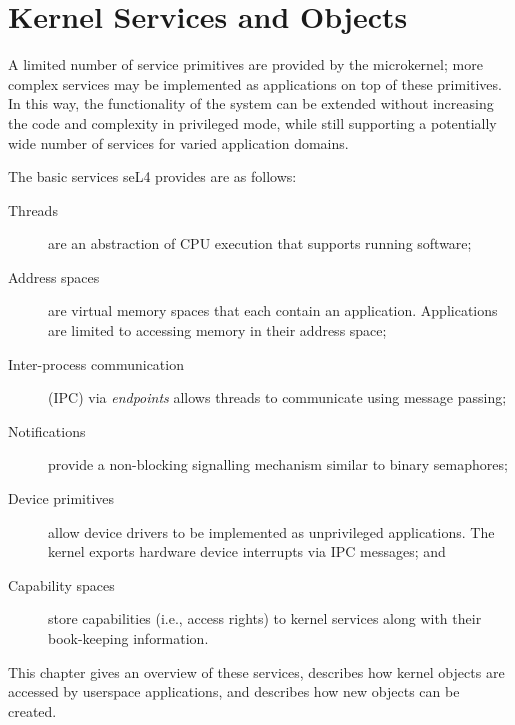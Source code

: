 %
%
%
%

\chapter{\label{ch:objects}Kernel Services and Objects}

A limited number of service primitives are provided by the microkernel;
more complex services may be implemented as applications on top of these
primitives. In this way, the functionality of the system can be extended
without increasing the code and complexity in privileged mode, while
still supporting a potentially wide number of services for varied
application domains.

The basic services seL4 provides are as follows:
\begin{description}
    \item[Threads] are an abstraction of CPU execution that supports
    running software;

    \item[Address spaces] are virtual memory spaces that each contain an
    application. Applications are limited to accessing memory in their
    address space;

    \item[Inter-process communication] (IPC) via \emph{endpoints} allows
    threads to communicate using message passing;

    \item[Notifications] provide a non-blocking signalling mechanism
      similar to binary semaphores;

    \item[Device primitives] allow device drivers to be implemented as
    unprivileged applications.  The kernel exports hardware device
    interrupts via IPC messages; and

    \item[Capability spaces] store capabilities (i.e., access rights) to
    kernel services along with their book-keeping information.
\end{description}

This chapter gives an overview of these services, describes how kernel
objects are accessed by userspace applications, and describes how new
objects can be created.

